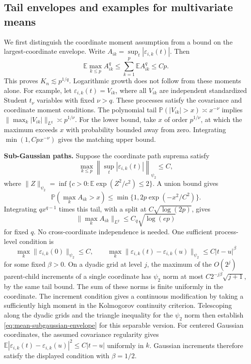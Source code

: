 \documentclass[10pt]{book}
\newcommand{\expect}{\mathbb{E}}
\newcommand{\prob}{\mathbb{P}}
\numberwithin{equation}{section}
\begin{document}
\subsection{Tail envelopes and examples for multivariate means}
\label{app:mean-heavy-tail-example}

We first distinguish the coordinate moment assumption from a bound
on the largest-coordinate envelope. Write
$A_{ik}=\sup_t|\varepsilon_{i,k}(t)|$. Then
\[
\expect\max_{k\le p}A_{ik}^q
\le\sum_{k=1}^p\expect A_{ik}^q\le Cp .
\]
This proves $K_n\lesssim p^{1/q}$. Logarithmic growth does not follow
from these moments alone. For example, let
$\varepsilon_{i,k}(t)=V_{ik}$, where all $V_{ik}$ are independent
standardized Student $t_\nu$ variables with fixed $\nu>q$.
These processes satisfy the covariance and coordinate moment conditions.
The polynomial tail $\prob(|V_{ik}|>x)\asymp x^{-\nu}$ implies
$\|\max_k|V_{ik}|\|_{L^q}\asymp p^{1/\nu}$.
For the lower bound, take $x$ of order $p^{1/\nu}$, at which the
maximum exceeds $x$ with probability bounded away from zero.
Integrating $\min(1,Cp x^{-\nu})$ gives the matching upper bound.

\noindent\textbf{Sub-Gaussian paths.}
Suppose the coordinate path suprema satisfy
\begin{equation}
\max_{k\le p}\left\|\sup_t|\varepsilon_{i,k}(t)|\right\|_{\psi_2}\le C,
\label{eq:mean-subgaussian-envelope}
\end{equation}
where $\|Z\|_{\psi_2}=\inf\{c>0:\expect\exp(Z^2/c^2)\le2\}$.
A union bound gives
\[
\prob(\max_k A_{ik}>x)\le
\min\{1,2p\exp(-x^2/C^2)\}.
\]
Integrating $q x^{q-1}$ times this tail, with a split at
$C\sqrt{\log(2p)}$, gives
\[
\|\max_k A_{ik}\|_{L^q}\le C_q\sqrt{\log(ep)}
\]
for fixed $q$.
No cross-coordinate independence is needed.
One sufficient process-level condition is
\[
\max_k\|\varepsilon_{i,k}(0)\|_{\psi_2}\le C,\qquad
\max_k\|\varepsilon_{i,k}(t)-\varepsilon_{i,k}(u)\|_{\psi_2}
\le C|t-u|^\beta
\]
for some fixed $\beta>0$. On a dyadic grid at level $j$, the maximum
of the $O(2^j)$ parent-child increments of a single coordinate has
$\psi_2$ norm at most $C2^{-j\beta}\sqrt{j+1}$, by the same tail
bound. The sum of these norms is finite uniformly in the coordinate.
The increment condition gives a continuous modification by taking
a sufficiently high moment in the Kolmogorov continuity criterion.
Telescoping along the dyadic grids and the triangle inequality for
the $\psi_2$ norm then establish
\eqref{eq:mean-subgaussian-envelope} for this separable version.
For centered Gaussian coordinates, the assumed covariance regularity
gives $\expect|\varepsilon_{i,k}(t)-\varepsilon_{i,k}(u)|^2
\le C|t-u|$ uniformly in $k$. Gaussian increments therefore satisfy
the displayed condition with $\beta=1/2$.
\end{document}
